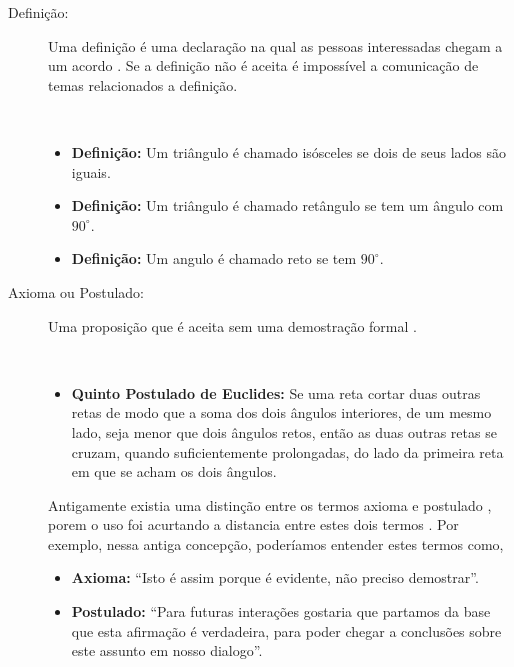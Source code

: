 \begin{description}

\item[Definição:]  Uma definição é uma declaração na qual as pessoas interessadas chegam a um acordo \cite[pp. 37]{solow1987como}.
Se a definição não é aceita é impossível a comunicação de temas relacionados a definição.
\begin{example}~\\
\begin{itemize}
\item \textbf{Definição:} Um triângulo é chamado isósceles se dois de seus lados são iguais.
\item \textbf{Definição:} Um triângulo é chamado retângulo se tem um ângulo com $90^{\circ}$.
\item \textbf{Definição:} Um angulo é chamado reto se tem  $90^{\circ}$.
\end{itemize}
\end{example}

\item[Axioma ou Postulado:]   
Uma proposição que é aceita sem uma demostração formal \cite[pp. 47]{fossa2009introducao} \cite[pp. 41]{solow1987como}.
\begin{example}~\\
\begin{itemize}
\item \textbf{Quinto Postulado de Euclides:} Se uma reta cortar duas outras retas de modo que a soma dos dois ângulos interiores, de um mesmo lado, seja menor que dois ângulos retos, então as duas outras retas se cruzam, quando suficientemente prolongadas, do lado da primeira reta em que se acham os dois ângulos.
\end{itemize}
\end{example}

Antigamente existia uma distinção entre os termos axioma e postulado \cite[pp. 115]{de1863ensaio},
porem o uso foi acurtando a distancia entre estes dois termos \cite[pp. 243]{mora2000dicionario}.
Por exemplo, nessa antiga concepção, poderíamos entender estes termos como,
\begin{itemize}
\item \textbf{Axioma:} ``Isto é assim porque é evidente, não preciso demostrar''.
\item \textbf{Postulado:} ``Para futuras interações gostaria que partamos da base que esta afirmação é verdadeira,
 para poder chegar a conclusões sobre este assunto em nosso dialogo''.
\end{itemize}



\end{description}

